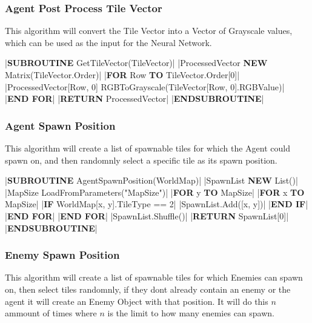 \begin{flushleft}
                \vspace{0.5cm}
            \subsubsection{Agent Post Process Tile Vector}
                This algorithm will convert the Tile Vector into a Vector of Grayscale values, which can be used as the input for the Neural
                Network.

                \vspace{0.2cm}
                \begin{pseudocode}
|\textbf{SUBROUTINE} GetTileVector(TileVector)|
    |ProcessedVector \leftarrow \textbf{NEW} Matrix(TileVector.Order)|
    |\textbf{FOR} Row  \textbf{TO} TileVector.Order[0]|
        |ProcessedVector[Row, 0] \leftarrow RGBToGrayscale(TileVector[Row, 0].RGBValue)|
    |\textbf{END FOR}|
    |\textbf{RETURN} ProcessedVector|
|\textbf{ENDSUBROUTINE}|
                \end{pseudocode}
                
                \vspace{0.5cm}
            \subsubsection{Agent Spawn Position}
                This algorithm will create a list of spawnable tiles for which the Agent could spawn on, and then randomnly select a specific
                tile as its spawn position.

                \vspace{0.2cm}
                \begin{pseudocode}
|\textbf{SUBROUTINE} AgentSpawnPosition(WorldMap)|
    |SpawnList \leftarrow \textbf{NEW} List()|
    |MapSize \leftarrow LoadFromParameters("MapSize")|
    |\textbf{FOR} y  \textbf{TO} MapSize|
        |\textbf{FOR} x  \textbf{TO} MapSize|
            |\textbf{IF} WorldMap[x, y].TileType == 2|
                |SpawnList.Add([x, y])|
            |\textbf{END IF}|
        |\textbf{END FOR}|
    |\textbf{END FOR}|
    |SpawnList.Shuffle()|
    |\textbf{RETURN} SpawnList[0]|
|\textbf{ENDSUBROUTINE}|
                \end{pseudocode}

                \vspace{0.5cm}
            \subsubsection{Enemy Spawn Position}
                This algorithm will create a list of spawnable tiles for which Enemies can spawn on, then select tiles randomnly, if they dont
                already contain an enemy or the agent it will create an Enemy Object with that position. It will do this $n$ ammount of times 
                where $n$ is the limit to how many enemies can spawn.
                

\end{flushleft}
